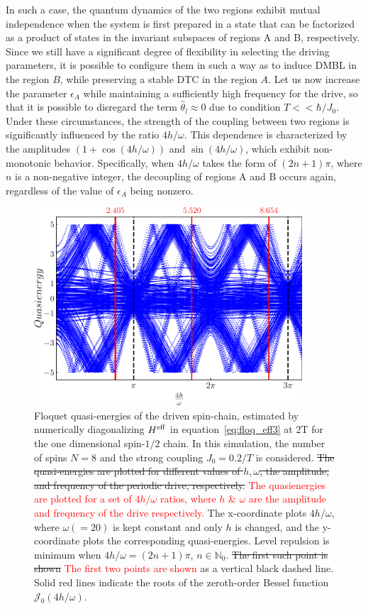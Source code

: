 \documentclass[12pt]{iopart}
\newcommand{\red}[1]{\textcolor{red}{#1}}
\begin{document}
In such a case, the quantum dynamics of the two regions exhibit mutual independence when the system is first prepared in a state that can be factorized as a product of states in the invariant subspaces of regions A and B, respectively. Since we still have a significant degree of flexibility in selecting the driving parameters, it is possible to configure them in such a way as to induce DMBL in the region $B$, while preserving a stable DTC in the region $A$. Let us now increase the parameter $\epsilon_A$ while maintaining a sufficiently high frequency for the drive, so that it is possible to disregard the term $\hat{\theta}_l \approx 0$ due to condition $T<<\hbar/J_0$. Under these circumstances, the strength of the coupling between two regions is significantly influenced by the ratio $4h/\omega$. This dependence is characterized by the amplitudes $(1+\cos(4h/\omega))$ and $\sin(4h/\omega)$, which exhibit non-monotonic behavior. Specifically, when $4h/\omega$ takes the form of $(2n+1)\pi$, where $n$ is a non-negative integer, the decoupling of regions A and B occurs again, regardless of the value of $\epsilon_A$ being nonzero.
\begin{figure}[h!]
    \centering
    \includegraphics[width=10cm]{figure3.pdf}
    \caption{Floquet quasi-energies of the driven spin-chain,  estimated by numerically diagonalizing $H^{\rm eff}$ in equation~\eqref{eq:floq_eff3} at 2T for the one dimensional spin-$1/2$ chain. In this simulation, the number of spins $N=8$ and the strong coupling $J_0=0.2/T$ is considered. \sout{The quasi-energies are plotted for different values of $h,\omega$, the amplitude, and frequency of the periodic drive, respectively.} \red{The quasienergies are plotted for a set of $4h/\omega$ ratios, where $h$ \& $\omega$ are the amplitude and frequency of the drive respectively.} The x-coordinate plots ${4h}/{\omega}$, where $\omega( = 20)$ is kept constant and only $h$ is changed, and the y-coordinate plots the corresponding quasi-energies.  Level repulsion is minimum when ${4h}/{\omega} = (2n+1)\pi$, $n\in \mathbb{N}_0$. \sout{The first such point is shown}\red{ The first two points are shown} as a vertical black dashed line. Solid red lines indicate the roots of the zeroth-order Bessel function $\mathcal{J}_0(4h/\omega)$.}
    \label{Fig:quasienergy_new}
\end{figure}	
\end{document}
